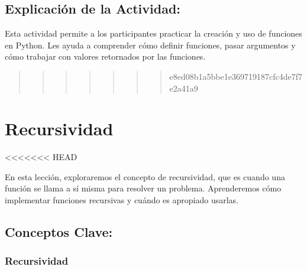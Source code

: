\documentclass[
  a4paper,
  DIV=11,
  numbers=noendperiod,
  onepage,
  openany]{scrreprt}
\begin{document}
\hypertarget{explicaciuxf3n-de-la-actividad-43}{%
\section{Explicación de la
Actividad:}\label{explicaciuxf3n-de-la-actividad-43}}

Esta actividad permite a los participantes practicar la creación y uso
de funciones en Python. Les ayuda a comprender cómo definir funciones,
pasar argumentos y cómo trabajar con valores retornados por las
funciones.

\begin{quote}
\begin{quote}
\begin{quote}
\begin{quote}
\begin{quote}
\begin{quote}
\begin{quote}
e8ed08b1a5bbe1e369719187cfc4de7f7e2a41a9
\end{quote}
\end{quote}
\end{quote}
\end{quote}
\end{quote}
\end{quote}
\end{quote}

\hypertarget{recursividad}{%
\chapter{Recursividad}\label{recursividad}}

\textless\textless\textless\textless\textless\textless\textless{} HEAD

En esta lección, exploraremos el concepto de recursividad, que es cuando
una función se llama a sí misma para resolver un problema. Aprenderemos
cómo implementar funciones recursivas y cuándo es apropiado usarlas.

\hypertarget{conceptos-clave-46}{%
\section{Conceptos Clave:}\label{conceptos-clave-46}}

\hypertarget{recursividad-1}{%
\subsection{Recursividad}\label{recursividad-1}}
\end{document}
